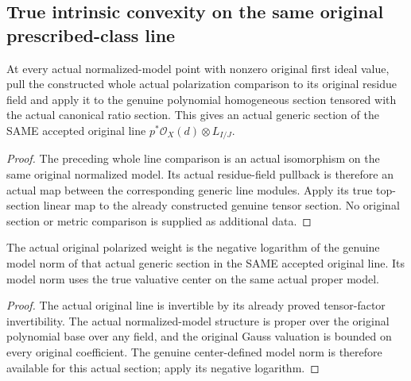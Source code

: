 \subsection{True intrinsic convexity on the same original prescribed-class line}

\begin{definition}
\label{local:actual-original-polarized-model-generic-section}
\leanok
{}
At every actual normalized-model point with nonzero original first ideal value,
pull the constructed whole actual polarization comparison to its original
residue field and apply it to the genuine polynomial homogeneous section
tensored with the actual canonical ratio section. This gives an actual generic
section of the SAME accepted original line $p^*\mathcal O_X(d)\otimes L_{I/J}$.
\end{definition}
\begin{proof}
The preceding whole line comparison is an actual isomorphism on the same
original normalized model. Its actual residue-field pullback is therefore an
actual map between the corresponding generic line modules. Apply its true
top-section linear map to the already constructed genuine tensor section.
No original section or metric comparison is supplied as additional data.
\end{proof}

\begin{definition}
\label{local:actual-original-polarized-model-section-weight}
\leanok
{}
The actual original polarized weight is the negative logarithm of the genuine
model norm of that actual generic section in the SAME accepted original line.
Its model norm uses the true valuative center on the same actual proper model.
\end{definition}
\begin{proof}
The actual original line is invertible by its already proved tensor-factor
invertibility. The actual normalized-model structure is proper over the
original polynomial base over any field, and the original Gauss valuation
is bounded on every original coefficient. The genuine center-defined model
norm is therefore available for this actual section; apply its negative logarithm.
\end{proof}

